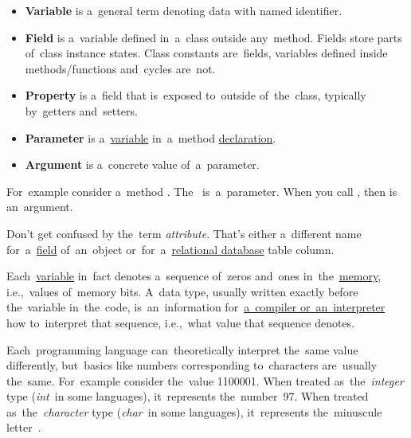 \label{variablefieldproperty}
\begin{itemize}
    \item \textbf{Variable} is a~general term denoting data with named identifier.
    \item \textbf{Field} is a~variable defined in~a~class outside any~method.
          Fields store parts of~class instance states.
          Class constants are~fields, variables defined inside \mbox{methods/functions} and~cycles are~not.
    \item \textbf{Property} is a~field that is~exposed to~outside of~the~class, typically by~getters and~setters.
\end{itemize}
\newpage

\label{parameterargument}
\begin{itemize}
    \item \textbf{Parameter} is a~\hyperref[variablefieldproperty]{variable} in~a~method \hyperref[declarationdefinition]{declaration}.
    \item \textbf{Argument} is a~concrete value of~a~parameter.
\end{itemize}
For~example consider a~method .
The~ is~a~parameter.
When you call , then  is an~argument.

\warning Don't get confused by the~term \textit{attribute}.
That's either a~different name for~a~\hyperref[variablefieldproperty]{field} of~an~object or~for~a~\hyperref[relationaldatabase]{relational database} table column.

\label{datatypes}
Each~\hyperref[variablefieldproperty]{variable} in~fact denotes a~sequence of~zeros and~ones in~the~\hyperref[systemmemory]{memory}, i.e.,~values of~memory bits.
A~data type, usually written exactly before the~variable in~the~code, is~an~information for~\hyperref[compiledinterpretedlanguages]{a~compiler or~an~interpreter} how to~interpret that sequence, i.e.,~what value that sequence denotes.

Each~programming language can~theoretically interpret the~same value differently, but~basics like numbers corresponding to~characters are~usually the~same.
For~example consider the~value 1100001.
When treated as~the~\textit{integer} type (\textit{int}~in some languages), it~represents the~number~97.
When treated as~the~\textit{character} type (\textit{char}~in some languages), it~represents the~minuscule letter~.


